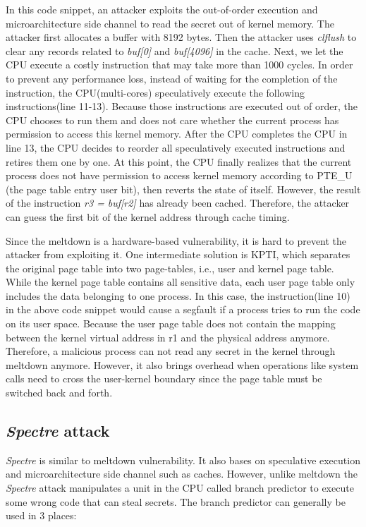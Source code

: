 In this code snippet, an attacker exploits the out-of-order execution and 
microarchitecture side channel to read the secret out of kernel memory. 
The attacker first allocates a buffer with 8192 bytes. Then the attacker uses 
\emph{clflush} to clear any records related to \emph{buf[0]} and \emph{buf[4096]} in the cache. 
Next, we let the CPU execute a costly instruction that may take more than 1000 cycles. 
In order to prevent any performance loss, instead of waiting for the completion of the instruction,  
the CPU(multi-cores) speculatively execute the following instructions(line 11-13). 
Because those instructions are executed out of order, the CPU chooses to run them and does 
not care whether the current process has permission to access this kernel memory. 
After the CPU completes the CPU in line 13, the CPU decides to reorder all speculatively 
executed instructions and retires them one by one. At this point, the CPU finally 
realizes that the current process does not have permission to access kernel memory 
according to PTE\_U (the page table entry user bit), then reverts the state of itself. 
However, the result of the instruction \emph{r3 = buf[r2]} has already been cached. Therefore, 
the attacker can guess the first bit of the kernel address through cache timing\cite{11}. 

Since the meltdown is a hardware-based vulnerability, it is hard to prevent the attacker 
from exploiting it. One intermediate solution is KPTI\cite{2}, which separates the original page 
table into two page-tables, i.e., user and kernel page table.  While the kernel page table 
contains all sensitive data, each user page table only includes the data belonging to one process. 
In this case, the instruction(line 10) in the above code snippet would cause a segfault if 
a process tries to run the code on its user space. Because the user page table does not contain 
the mapping between the kernel virtual address in r1 and the physical address anymore. Therefore, 
a malicious process can not read any secret in the kernel through meltdown anymore. However, 
it also brings overhead when operations like system calls need to cross the user-kernel boundary 
since the page table must be switched back and forth.

\subsection{\emph{Spectre} attack}

\emph{Spectre}\cite{4} is similar to meltdown vulnerability. It also bases on speculative 
execution and microarchitecture side channel such as caches. However, unlike meltdown the 
\emph{Spectre} attack manipulates a unit in the CPU called branch predictor to execute some wrong 
code that can steal secrets.  The branch predictor can generally be used in 3 places\cite{5}:



